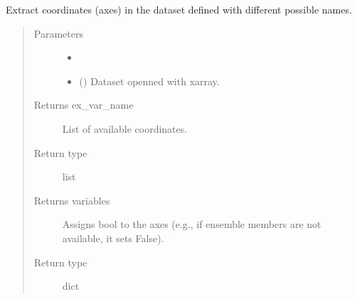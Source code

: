 \documentclass[a4paper,11pt,english]{sphinxmanual}
\begin{document}
\begin{fulllineitems}
\label{\detokenize{modules:envlib.extract_data.extract_coordinates}}
Extract coordinates (axes) in the dataset defined with different possible names.
\begin{quote}\begin{description}
\item[{Parameters}] \leavevmode\begin{itemize}
\item {} 
 \textendash{} 

\item {} 
 () \textendash{} Dataset openned with xarray.

\end{itemize}

\item[{Returns ex\_var\_name}] \leavevmode
List of available coordinates.

\item[{Return type}] \leavevmode
list

\item[{Returns variables}] \leavevmode
Assigns bool to the axes (e.g., if ensemble members are not available, it sets False).

\item[{Return type}] \leavevmode
dict

\end{description}\end{quote}

\end{fulllineitems}

\end{document}
